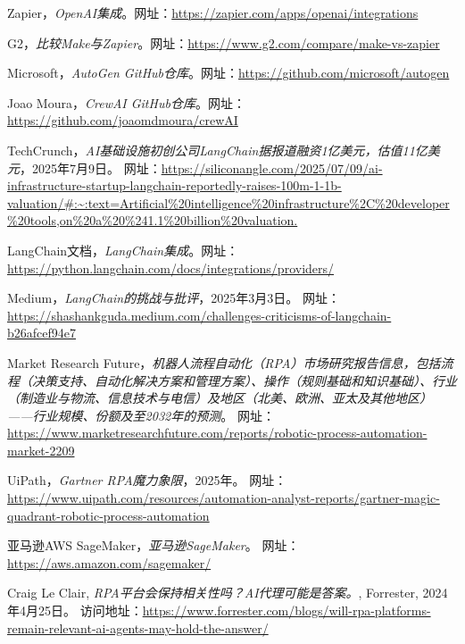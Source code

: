 \documentclass[11点, A4纸, 单面]{article}
\begin{document}
\begin{thebibliography}{99}
    Zapier，\textit{OpenAI集成}。网址：\url{https://zapier.com/apps/openai/integrations}

    G2，\textit{比较Make与Zapier}。网址：\url{https://www.g2.com/compare/make-vs-zapier}

    Microsoft，\textit{AutoGen GitHub仓库}。网址：\url{https://github.com/microsoft/autogen}

    Joao Moura，\textit{CrewAI GitHub仓库}。网址：\url{https://github.com/joaomdmoura/crewAI}

    TechCrunch，\textit{AI基础设施初创公司LangChain据报道融资1亿美元，估值11亿美元}，2025年7月9日。
    网址：\url{https://siliconangle.com/2025/07/09/ai-infrastructure-startup-langchain-reportedly-raises-100m-1-1b-valuation/#:~:text=Artificial%20intelligence%20infrastructure%2C%20developer%20tools,on%20a%20%241.1%20billion%20valuation.}

    LangChain文档，\textit{LangChain集成}。网址：\url{https://python.langchain.com/docs/integrations/providers/}

    Medium，\textit{LangChain的挑战与批评}，2025年3月3日。
    网址：\url{https://shashankguda.medium.com/challenges-criticisms-of-langchain-b26afcef94e7}

    Market Research Future，\textit{机器人流程自动化（RPA）市场研究报告信息，包括流程（决策支持、自动化解决方案和管理方案）、操作（规则基础和知识基础）、行业（制造业与物流、信息技术与电信）及地区（北美、欧洲、亚太及其他地区）——行业规模、份额及至2032年的预测}。
    网址：\url{https://www.marketresearchfuture.com/reports/robotic-process-automation-market-2209}

    UiPath，\textit{Gartner RPA魔力象限}，2025年。
    网址：\url{https://www.uipath.com/resources/automation-analyst-reports/gartner-magic-quadrant-robotic-process-automation}

    亚马逊AWS SageMaker，\textit{亚马逊SageMaker}。
    网址：\url{https://aws.amazon.com/sagemaker/}

    Craig Le Clair, \textit{RPA平台会保持相关性吗？AI代理可能是答案。}, Forrester, 2024年4月25日。 访问地址：\url{https://www.forrester.com/blogs/will-rpa-platforms-remain-relevant-ai-agents-may-hold-the-answer/}

\end{thebibliography}
\end{document}
